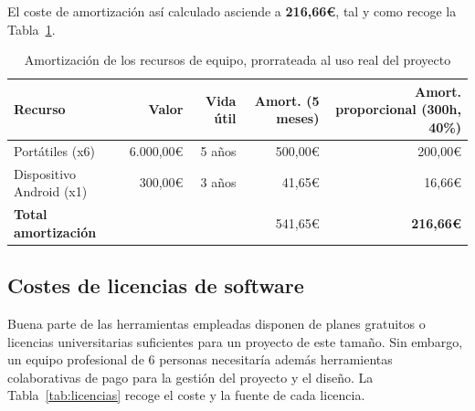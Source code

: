 El coste de amortización así calculado asciende a \textbf{216,66€}, tal y como recoge la Tabla~\ref{tab:amortizacion}.

\begin{table}[ht!]
\centering
\begin{tabular}{|l|r|r|r|r|}
\hline
\textbf{Recurso} & \textbf{Valor} & \textbf{Vida útil} & \textbf{Amort. (5 meses)} & \textbf{Amort. proporcional 
                                                                                                \hline (300h, 40\%)\hline } \\
\hline
Portátiles (x6) & 6.000,00€ & 5 años & 500,00€ & 200,00€ \\
\hline
Dispositivo Android (x1) & 300,00€ & 3 años & 41,65€ & 16,66€ \\
\hline
\textbf{Total amortización} & & & 541,65€ & \textbf{216,66€} \\
\hline
\end{tabular}
\caption{Amortización de los recursos de equipo, prorrateada al uso real del proyecto}
\label{tab:amortizacion}
\end{table}

\subsection{Costes de licencias de software}

Buena parte de las herramientas empleadas disponen de planes gratuitos o licencias universitarias suficientes para un proyecto de este tamaño. Sin embargo, un equipo profesional de 6 personas necesitaría además herramientas colaborativas de pago para la gestión del proyecto y el diseño. La Tabla~\ref{tab:licencias} recoge el coste y la fuente de cada licencia.

